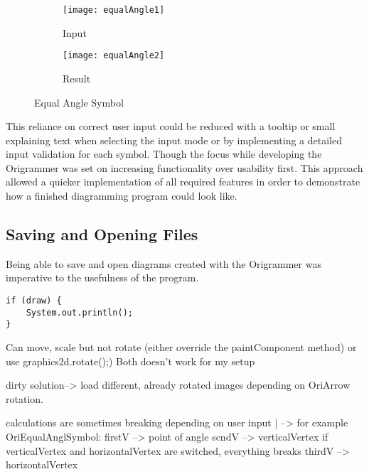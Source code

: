 \begin{figure*}[h]
    \centering
    \begin{subfigure}[b]{0.4\textwidth}
        \texttt{[image: equalAngle1]}
        \caption{Input}
        \label{fig:equalAngle1}
    \end{subfigure}
    \begin{subfigure}[b]{0.4\textwidth}
        \texttt{[image: equalAngle2]}
        \caption{Result}
        \label{fig:equalAngle2}
    \end{subfigure}
    \caption{Equal Angle Symbol}
\end{figure*}

This reliance on correct user input could be reduced with a tooltip or small explaining text when selecting the input mode or by implementing a detailed input validation for each symbol. Though the focus while developing the Origrammer was set on increasing functionality over usability first. This approach allowed a quicker implementation of all required features in order to demonstrate how a finished diagramming program could look like.


\subsection{Saving and Opening Files}

Being able to save and open diagrams created with the Origrammer was imperative to the usefulness of the program.

\begin{lstlisting}
if (draw) {
	System.out.println();
}
\end{lstlisting}



Can move, scale but not rotate (either override the paintComponent method) or use graphics2d.rotate();)
Both doesn't work for my setup

dirty solution--> load different, already rotated images depending on OriArrow rotation.




calculations are sometimes breaking depending on user input
|
--> for example OriEqualAnglSymbol: 	firstV	--> point of angle
						scndV	--> verticalVertex			if verticalVertex and horizontalVertex are switched, everything breaks
						thirdV --> horizontalVertex
						
						
